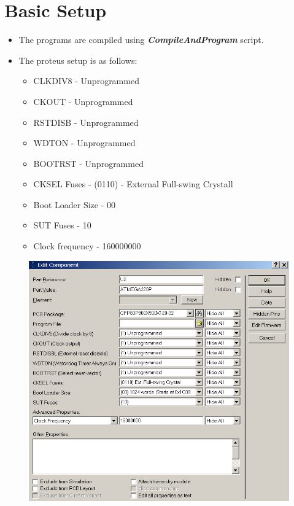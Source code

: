 \documentclass[oneside]{book}
\begin{document}
\section*{Basic Setup}
\begin{itemize}
    \item The programs are compiled using \emph{\textbf{CompileAndProgram}} script.
    \item The proteus setup is as follows:
    \begin{itemize}
        \item CLKDIV8 - Unprogrammed
        \item CKOUT - Unprogrammed
        \item RSTDISB - Unprogrammed
        \item WDTON - Unprogrammed
        \item BOOTRST - Unprogrammed
        \item CKSEL Fuses - (0110) - External Full-swing Crystall
        \item Boot Loader Size - 00
        \item SUT Fuses - 10
        \item Clock frequency - 160000000
    \end{itemize}
\end{itemize}
\begin{figure}[H]
    \centering
    \includegraphics[height=0.75\textwidth]{setup.png}
\end{figure}
\end{document}
